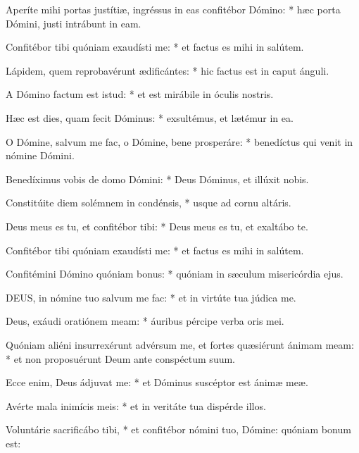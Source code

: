 Aperíte mihi portas justítiæ, ingréssus in eas confitébor Dómino: * hæc porta Dómini, justi intrábunt in eam.

Confitébor tibi quóniam exaudísti me: * et factus es mihi in salútem.

Lápidem, quem reprobavérunt ædificántes: * hic factus est in caput ánguli.

A Dómino factum est istud: * et est mirábile in óculis nostris.

Hæc est dies, quam fecit Dóminus: * exsultémus, et lætémur in ea.

O Dómine, salvum me fac, o Dómine, bene prosperáre: * benedíctus qui venit in nómine Dómini.

Benedíximus vobis de domo Dómini: * Deus Dóminus, et illúxit nobis.

Constitúite diem solémnem in condénsis, * usque ad cornu altáris.

Deus meus es tu, et confitébor tibi: * Deus meus es tu, et exaltábo te.

Confitébor tibi quóniam exaudísti me: * et factus es mihi in salútem.

Confitémini Dómino quóniam bonus: * quóniam in sæculum misericórdia ejus.



\lettrine[lines=2]{D}{EUS}, in nómine tuo salvum me fac: * et in virtúte tua júdica me.

Deus, exáudi oratiónem meam: * áuribus pércipe verba oris mei.

Quóniam aliéni insurrexérunt advérsum me, et fortes quæsiérunt ánimam meam: * et non proposuérunt Deum ante conspéctum suum.

Ecce enim, Deus ádjuvat me: * et Dóminus suscéptor est ánimæ meæ.

Avérte mala inimícis meis: * et in veritáte tua dispérde illos.

Voluntárie sacrificábo tibi, * et confitébor nómini tuo, Dómine: quóniam bonum est:

